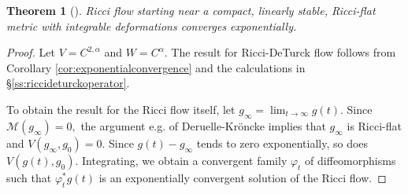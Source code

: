 \documentclass[12pt]{amsart}
\newcommand{\calM}{\mathcal{M}}
\renewcommand{\1}{{\mathbf 1}}
\newtheorem{thm}{Theorem}[section]
\theoremstyle{others}
\newtheorem{rmk}[thm]{Remark}
\numberwithin{equation}{section}
\begin{document}
\begin{thm}[\cite{Sesum06}] \label{thm stability compact case}
    Ricci flow starting near a compact, linearly stable, Ricci-flat metric with integrable deformations converges exponentially.
\end{thm}
\begin{proof}
    Let $V = C^{2, \alpha}$ and $W = C^\alpha.$ The result for Ricci-DeTurck flow follows from Corollary \ref{cor:exponentialconvergence} and the calculations in \S \ref{ss:riccideturckoperator}. %
    
To obtain the result for the Ricci flow itself, let $g_\infty = \lim_{t \to \infty} g(t).$ Since $\calM(g_\infty) = 0,$ the argument e.g. of Deruelle-Kr{\"o}ncke \cite[Theorem 2.7]{DeruelleKroncke20} implies that $g_\infty$ is Ricci-flat and $V(g_\infty, g_0) = 0.$ Since $g(t) - g_\infty$ tends to zero exponentially, so does $V(g(t), g_0).$ Integrating, we obtain a convergent family $\varphi_t$ of diffeomorphisms such that $\varphi_t^* g(t)$ is an exponentially convergent solution of the Ricci flow.
\end{proof}

\vspace{10mm}
\end{document}
